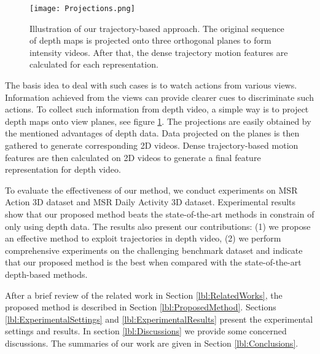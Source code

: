 \begin{figure}[H]
	\begin{center}
		\texttt{[image: Projections.png]}
	\end{center}
	\caption{\label{lbl:Figure_ProposedMethod}Illustration of our trajectory-based approach. The original sequence of depth maps is projected onto three orthogonal planes to form intensity videos. After that, the dense trajectory motion features are calculated for each representation.}
\end{figure}

The basis idea to deal with such cases is to watch actions from various views.
Information achieved from the views can provide clearer cues to discriminate such actions.
To collect such information from depth video, a simple way is to project depth maps onto view planes, see figure \ref{lbl:Figure_ProposedMethod}.
The projections are easily obtained by the mentioned advantages of depth data.
Data projected on the planes is then gathered to generate corresponding 2D videos.
Dense trajectory-based motion features are then calculated on 2D videos to generate a final feature representation for depth video.

To evaluate the effectiveness of our method, we conduct experiments on MSR Action 3D dataset and MSR Daily Activity 3D dataset.
Experimental results show that our proposed method beats the state-of-the-art methods in constrain of only using depth data.
The results also present our contributions: (1) we propose an effective method to exploit trajectories in depth video, (2) we perform comprehensive experiments on the challenging benchmark dataset and indicate that our proposed method is the best when compared with the state-of-the-art depth-based methods.

After a brief review of the related work in Section \ref{lbl:RelatedWorks}, the proposed method is described in Section \ref{lbl:ProposedMethod}. Sections \ref{lbl:ExperimentalSettings} and \ref{lbl:ExperimentalResults} present the experimental settings and results. In section \ref{lbl:Discussions} we provide some concerned discussions. The summaries of our work are given in Section \ref{lbl:Conclusions}.
